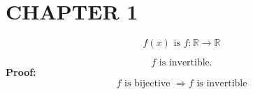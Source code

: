 



\section*{CHAPTER 1}

\begin{mydefinition}
\[f(x) \text{ is } f: \mathbb{R} \rightarrow \mathbb{R}\]
\end{mydefinition}

\begin{mytheorem}
\[f \text{ is invertible.}\]
\textbf{Proof:}
\[f \text{ is bijective } \Rightarrow f \text{ is invertible}\]
\end{mytheorem}



